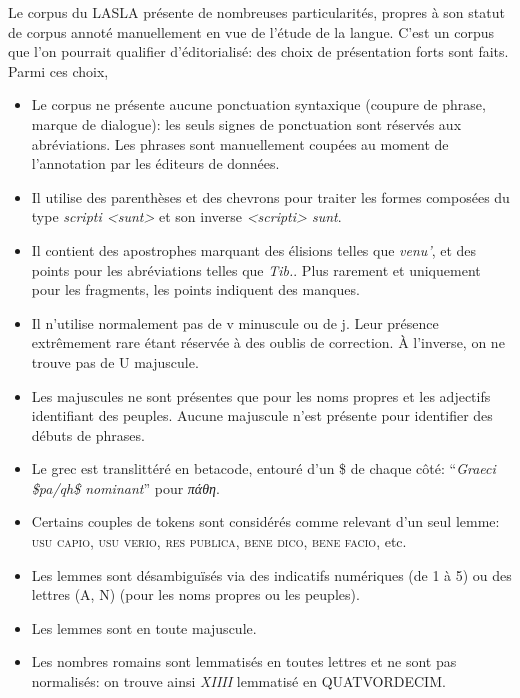 Le corpus du LASLA présente de nombreuses particularités, propres à son statut de corpus annoté manuellement en vue de l'étude de la langue. C'est un corpus que l'on pourrait qualifier d'éditorialisé: des choix de présentation forts sont faits. Parmi ces choix, 
\begin{itemize}
    \item Le corpus ne présente aucune ponctuation syntaxique (coupure de phrase, marque de dialogue): les seuls signes de ponctuation sont réservés aux abréviations. Les phrases sont manuellement coupées au moment de l'annotation par les éditeurs de données. 
    \item Il utilise des parenthèses et des chevrons pour traiter les formes composées du type \textit{scripti <sunt>} et son inverse \textit{<scripti> sunt}.
    \item Il contient des apostrophes marquant des élisions  telles que \textit{venu'}, et des points pour les abréviations telles que \textit{Tib.}. Plus rarement et uniquement pour les fragments, les points indiquent des manques.
    \item Il n'utilise normalement pas de v minuscule ou de j. Leur présence extrêmement rare étant réservée à des oublis de correction. À l'inverse, on ne trouve pas de U majuscule.
    \item Les majuscules ne sont présentes que pour les noms propres et les adjectifs identifiant des peuples. Aucune majuscule n'est présente pour identifier des débuts de phrases.
    \item Le grec est translittéré en betacode, entouré d'un \$ de chaque côté: \enquote{\textit{Graeci \$pa/qh\$ nominant}} pour \textgreek{\textit{πάθη}}.
    \item Certains couples de tokens sont considérés comme relevant d'un seul lemme: \textsc{usu capio}, \textsc{usu verio}, \textsc{res publica}, \textsc{bene dico}, \textsc{bene facio}, etc.
    \item Les lemmes sont désambiguïsés via des indicatifs numériques (de 1 à 5) ou des lettres (A, N) (pour les noms propres ou les peuples).
    \item Les lemmes sont en toute majuscule.
    \item Les nombres romains sont lemmatisés en toutes lettres et ne sont pas normalisés: on trouve ainsi \textit{XIIII} lemmatisé en \textsc{QUATVORDECIM}.
\end{itemize}
